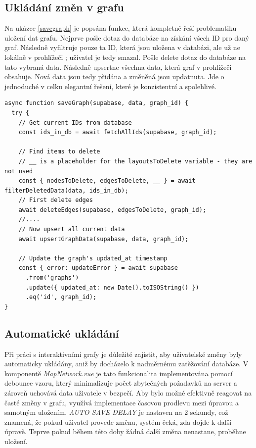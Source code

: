 \subsection{Ukládání změn v grafu}
Na ukázce \ref{savegraph} je popsána funkce, která kompletně řeší problematiku uložení dat grafu. Nejprve pošle dotaz do databáze na získání všech ID pro daný graf. Následně vyfiltruje pouze ta ID, která jsou uložena v databázi, ale už ne lokálně v prohlížeči \cite{W3}; uživatel je tedy smazal. Pošle delete dotaz do databáze na tato vybraná data. Následně upsertne všechna data, která graf v prohlížeči obsahuje. Nová data jsou tedy přidána a změněná jsou updatnuta. Jde o jednoduché v celku elegantní řešení, které je konzistentní a spolehlivé.
\begin{lstlisting}[style=JavaScript, firstnumber = 168, caption={utils/graphService.js, uložení grafu}, label={savegraph}]
async function saveGraph(supabase, data, graph_id) {
  try {
    // Get current IDs from database
    const ids_in_db = await fetchAllIds(supabase, graph_id);
    
    // Find items to delete
    // __ is a placeholder for the layoutsToDelete variable - they are not used 
    const { nodesToDelete, edgesToDelete, __ } = await filterDeletedData(data, ids_in_db);
    // First delete edges
    await deleteEdges(supabase, edgesToDelete, graph_id);
    //....
    // Now upsert all current data
    await upsertGraphData(supabase, data, graph_id);
    
    // Update the graph's updated_at timestamp
    const { error: updateError } = await supabase
      .from('graphs')
      .update({ updated_at: new Date().toISOString() })
      .eq('id', graph_id);
}
\end{lstlisting}
\subsection{Automatické ukládání}
Při práci s interaktivními grafy je důležité zajistit, aby uživatelské změny byly automaticky ukládány, aniž by docházelo k nadměrnému zatěžování databáze. V komponentě \textit{MapNetwork.vue} je tato funkcionalita implementována pomocí debounce vzoru, který minimalizuje počet zbytečných požadavků na server a zároveň uchovává data uživatele v bezpečí. \cite{autosave}
\newline
Aby bylo možné efektivně reagovat na časté změny v grafu, využívá implementace časovou prodlevu mezi úpravou a samotným uložením. \textit{AUTO SAVE DELAY} je nastaven na 2 sekundy, což znamená, že pokud uživatel provede změnu, systém čeká, zda dojde k další úpravě. Teprve pokud během této doby žádná další změna nenastane, proběhne uložení.

